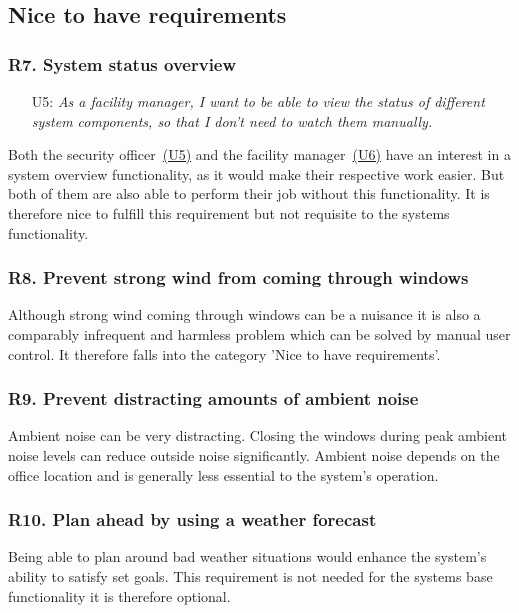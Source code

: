 \documentclass[runningheads]{llncs}
\begin{document}
\subsection{Nice to have requirements}
\subsubsection{R7. System status overview}\label{r7}
\begin{itemize}
    \item [U5:] \label{r6u1} \textit{As a facility manager, I want to be able to view the status of different system components, so that I don't need to watch them manually.}
\end{itemize}
Both the security officer~\hyperref[r6u1]{(U5)} and the facility manager~\hyperref[r6u1]{(U6)} have an interest in a system overview functionality, as it would make their respective work easier. But both of them are also able to perform their job without this functionality. It is therefore nice to fulfill this requirement but not requisite to the systems functionality.

\subsubsection{R8. Prevent strong wind from coming through windows}\label{r8}
Although strong wind coming through windows can be a  nuisance it is also a comparably infrequent and harmless problem which can be solved by manual user control. It therefore falls into the category 'Nice to have requirements'.

\subsubsection{R9. Prevent distracting amounts of ambient noise}\label{r9}
Ambient noise can be very distracting. Closing the windows during peak ambient noise levels can reduce outside noise significantly. Ambient noise depends on the office location and is generally less essential to the system's operation.

\subsubsection{R10. Plan ahead by using a weather forecast}\label{r10}
Being able to plan around bad weather situations would enhance the system's ability to satisfy set goals. This requirement is not needed for the systems base functionality it is therefore optional.   
\end{document}
